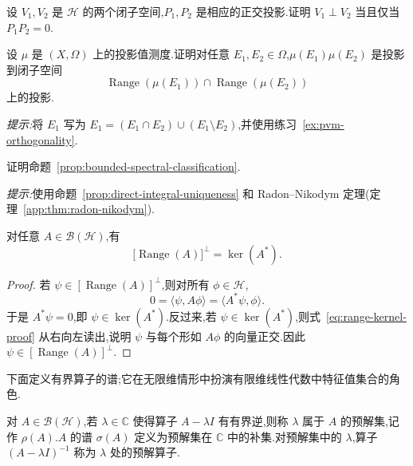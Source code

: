 {\begin{exercise}[正交投影的乘积]\label{ex:pvm-orthogonality}
设 \(V_{1},V_{2}\) 是 \(\mathcal{H}\) 的两个闭子空间,\(P_{1},P_{2}\) 是相应的正交投影.证明 \(V_{1}\perp V_{2}\) 当且仅当 \(P_{1}P_{2}=0\).
\end{exercise}

\begin{exercise}[投影值测度的交集]\label{ex:pvm-intersection}
设 \(\mu\) 是 \((X,\Omega)\) 上的投影值测度.证明对任意 \(E_{1},E_{2}\in\Omega\),\(\mu(E_{1})\mu(E_{2})\) 是投影到闭子空间
\[
\operatorname{Range}(\mu(E_{1}))\cap\operatorname{Range}(\mu(E_{2}))
\]
上的投影.

\emph{提示:}将 \(E_{1}\) 写为 \(E_{1}=(E_{1}\cap E_{2})\cup(E_{1}\setminus E_{2})\),并使用练习~\ref{ex:pvm-orthogonality}.
\end{exercise}

\begin{exercise}[证明谱分类定理]\label{ex:prove-spectral-classification}
证明命题~\ref{prop:bounded-spectral-classification}.

\emph{提示:}使用命题~\ref{prop:direct-integral-uniqueness} 和 Radon--Nikodym 定理(定理~\ref{app:thm:radon-nikodym}).
\end{exercise}

}

\begin{proposition}[值域与伴随的核]\label{prop:range-kernel-adjoint}
对任意 \(A\in\mathcal{B}(\mathcal{H})\),有
\[
\bigl[\operatorname{Range}(A)\bigr]^{\perp}=\ker(A^{*}).
\]
\end{proposition}

\begin{proof}
若 \(\psi\in[\operatorname{Range}(A)]^{\perp}\),则对所有 \(\phi\in\mathcal{H}\),
\[
0=\langle\psi,A\phi\rangle=\langle A^{*}\psi,\phi\rangle.
\label{eq:range-kernel-proof}
\]
于是 \(A^{*}\psi=0\),即 \(\psi\in\ker(A^{*})\).反过来,若 \(\psi\in\ker(A^{*})\),则式~\eqref{eq:range-kernel-proof} 从右向左读出,说明 \(\psi\) 与每个形如 \(A\phi\) 的向量正交.因此 \(\psi\in[\operatorname{Range}(A)]^{\perp}\).
\end{proof}

下面定义有界算子的谱;它在无限维情形中扮演有限维线性代数中特征值集合的角色.

\begin{definition}[谱与预解集]\label{def:spectrum-resolvent}
对 \(A\in\mathcal{B}(\mathcal{H})\),若 \(\lambda\in\mathbb{C}\) 使得算子 \(A-\lambda I\) 有有界逆,则称 \(\lambda\) 属于 \(A\) 的预解集,记作 \(\rho(A)\).\(A\) 的谱 \(\sigma(A)\) 定义为预解集在 \(\mathbb{C}\) 中的补集.对预解集中的 \(\lambda\),算子 \((A-\lambda I)^{-1}\) 称为 \(\lambda\) 处的预解算子.
\end{definition}

